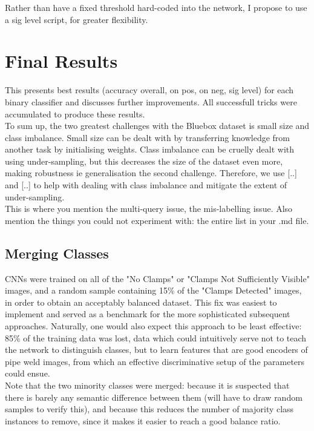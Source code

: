 \documentclass[a4paper,11pt]{article}
\begin{document}
Rather than have a fixed threshold hard-coded into the network, I propose to use a sig level script, for greater flexibility. \\



\section{Final Results}

This presents best results (accuracy overall, on pos, on neg, sig level) for each binary classifier and discusses further improvements. All successfull tricks were accumulated to produce these results. \\

To sum up, the two greatest challenges with the Bluebox dataset is small size and class imbalance. Small size can be dealt with by transferring knowledge from another task by initialising weights. Class imbalance can be cruelly dealt with using under-sampling, but this decreases the size of the dataset even more, making robustness ie generalisation the second challenge. Therefore, we use [..] and [..] to help with dealing with class imbalance and mitigate the extent of under-sampling. \\

This is where you mention the multi-query issue, the mis-labelling issue. Also mention the things you could not experiment with: the entire list in your .md file. \\

\subsection{Merging Classes}

CNNs were trained on all of the "No Clamps" or "Clamps Not Sufficiently Visible" images, and a random sample containing 15\% of the "Clamps Detected" images, in order to obtain an acceptably balanced dataset. This fix was easiest to implement and served as a benchmark for the more sophisticated subsequent approaches. Naturally, one would also expect this approach to be least effective: 85\% of the training data was lost, data which could intuitively serve not to teach the network to distinguish classes, but to learn features that are good encoders of pipe weld images, from which an effective discriminative setup of the parameters could ensue. \\

Note that the two minority classes were merged: because it is suspected that there is barely any semantic difference between them (will have to draw random samples to verify this), and because this reduces the number of majority class instances to remove, since it makes it easier to reach a good balance ratio. \\
\end{document}

